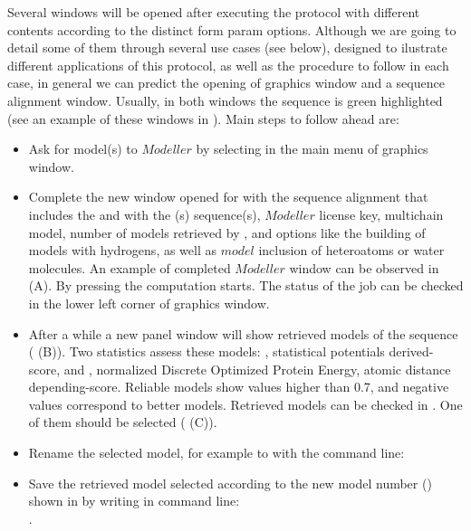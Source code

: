 \begin{itemize}
  Several \chimera windows will be opened after executing the protocol with different contents according to the distinct form param options. Although we are going to detail some of them through several use cases (see below), designed to ilustrate different applications of this protocol, as well as the procedure to follow in each case, in general we can predict the opening of \chimera graphics window and a sequence alignment window. Usually, in both windows the  sequence is green highlighted (see an example of these windows in ). Main steps to follow ahead are:
            \begin{itemize}
            \item Ask for model(s) to $Modeller$ by selecting  in the main menu of \chimera graphics window. 
            \item Complete the new window opened for  with the sequence alignment that includes the  and with the (s) sequence(s), $Modeller$ license key, multichain model, number of models retrieved by \modeller, and  options like the building of models with hydrogens, as well as $model$ inclusion of heteroatoms or water molecules. An example of completed $Modeller$ window can be observed in  (A). By pressing  the computation starts. The status of the job can be checked in the lower left corner of \chimera graphics window.
            \item After a while a new panel window will show retrieved models of the  sequence ( (B)). Two statistics assess these models: , statistical potentials derived-score, and , normalized Discrete Optimized Protein Energy, atomic distance depending-score. Reliable models show  values higher than 0.7, and negative  values correspond to better models.  Retrieved models can be checked in \chimera {}. One of them should be selected ( (C)).
            \item Rename the selected model, for example  to  with the command line:\\ 
            \item Save the retrieved model selected according to the new model number () shown in \chimera {} by writing in \chimera command line:\\.
            \end{itemize}
  

\end{itemize}
